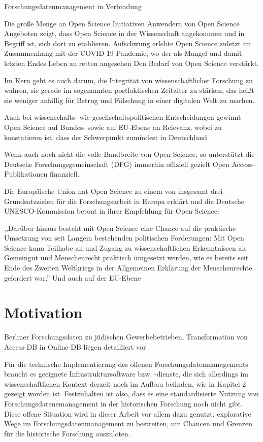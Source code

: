 \onehalfspacing

Forschungsdatenmanagement in Verbindung

Die große Menge an Open Science Initiativen Anwendern von Open Science Angeboten zeigt, dass Open Science in der Wissenschaft angekommen und in Begriff ist, sich dort zu etablieren. 
Aufschwung erlebte Open Science zuletzt im Zusammenhang mit der COVID-19-Pandemie, wo der als Mangel und damit letzten Endes Leben zu retten angesehen Den Bedarf von Open Science verstärkt. 



 Im Kern geht es auch darum, die Integrität von wissenschaftlicher Forschung zu wahren, sie gerade im sogenannten postfaktischen Zeitalter zu stärken, das heißt sie weniger anfällig für Betrug und Fälschung in einer digitalen Welt zu machen. 
  

 

Auch bei wissenschafts- wie gesellschaftspolitischen Entscheidungen gewinnt Open Science auf Bundes- sowie auf EU-Ebene an Relevanz, wobei zu konstatieren ist, dass der Schwerpunkt zumindest in Deutschland 


Wenn auch noch nicht die volle Bandbreite von Open Science, so unterstützt die Deutsche Forschungsgemeinschaft (DFG) immerhin offiziell gezielt Open Access-Publikationen finanziell. 

Die Europäische Union hat Open Science zu einem von insgesamt drei Grundsatzzielen für die Forschungsarbeit in Europa erklärt  und die  Deutsche UNESCO-Kommission betont in ihrer Empfehlung für Open Science:

,,Darüber hinaus besteht mit Open Science eine Chance auf die praktische Umsetzung von seit Langem bestehenden politischen Forderungen: Mit Open Science kann Teilhabe an und Zugang zu wissenschaftlichen Erkenntnissen als Gemeingut und Menschenrecht praktisch umgesetzt werden, wie es bereits seit Ende des Zweiten Weltkriegs in der Allgemeinen Erklärung der Menschenrechte gefordert war.''
Und auch auf der EU-Ebene 

\section{Motivation}

Berliner Forschungsdaten zu jüdischen Gewerbebetrieben, Transformation von Access-DB in Online-DB
liegen detailliert vor

Für die technische Implementierung des offenen Forschungsdatenmanagements braucht es geeignete Infrastruktursoftware bzw. -dienste, die sich allerdings im wissenschaftlichen Kontext derzeit noch im Aufbau befinden, wie in Kapitel 2 gezeigt worden ist. Festzuhalten ist also, dass es eine standardisierte Nutzung von Forschungsdatenemanagement in der historischen Forschung noch nicht gibt. Diese offene Situation wird in dieser Arbeit vor allem dazu genutzt, explorative Wege im Forschungsdatenmanagement zu bestreiten, um Chancen und Grenzen für die historische Forschung auszuloten.

